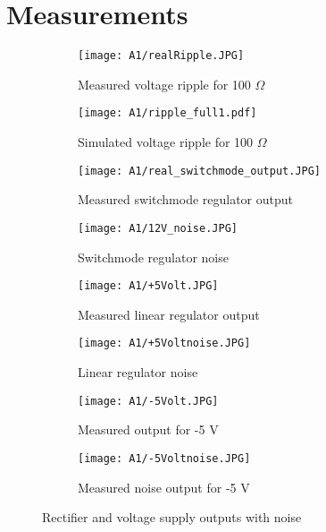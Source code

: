 \section{Measurements} \label{sec:measurements_rectifier}

\begin{figure}[H]
 \footnotesize
 \centering
    \begin{subfigure}[]{0.45\textwidth}
        \centering
      	\texttt{[image: A1/realRipple.JPG]}
        \caption{Measured voltage ripple for 100 $\Omega$}
        \label{fig:measuredripple}
    \end{subfigure}
    \begin{subfigure}[]{0.45\textwidth}
        \centering
      	\texttt{[image: A1/ripple\_full1.pdf]}
        \caption{Simulated voltage ripple for 100 $\Omega$}
        \label{fig:simripple}
    \end{subfigure}
    \begin{subfigure}[]{0.45\textwidth}
        \centering
        \texttt{[image: A1/real\_switchmode\_output.JPG]}
        \centering
        \caption{Measured switchmode regulator output}
        \label{fig:Switch_out_real}
    \end{subfigure}
    \begin{subfigure}[]{0.45\textwidth}
        \centering
        \texttt{[image: A1/12V\_noise.JPG]}
        \centering
        \caption{Switchmode regulator noise}
        \label{fig:switch_noise}
     \end{subfigure}
        \begin{subfigure}[]{0.45\textwidth}
        \centering
        \texttt{[image: A1/+5Volt.JPG]}
        \caption{Measured linear regulator output}
        \label{fig:linear_reg_out}
    \end{subfigure}
    \begin{subfigure}[]{0.45\textwidth}
        \centering
        \texttt{[image: A1/+5Voltnoise.JPG]}
        \caption{Linear regulator noise}
        \label{fig:linear_reg_noise}
    \end{subfigure}
    \begin{subfigure}[]{0.45\textwidth}
        \centering
        \texttt{[image: A1/-5Volt.JPG]}
        \caption{Measured output for -5 V}
        \label{fig:-5V output measured}
    \end{subfigure}
    \begin{subfigure}[]{0.45\textwidth}
        \centering
        \texttt{[image: A1/-5Voltnoise.JPG]}
        \caption{Measured noise output for -5 V}
        \label{fig:-5V output}
    \end{subfigure}
    \caption{Rectifier and voltage supply outputs with noise}
\end{figure}


